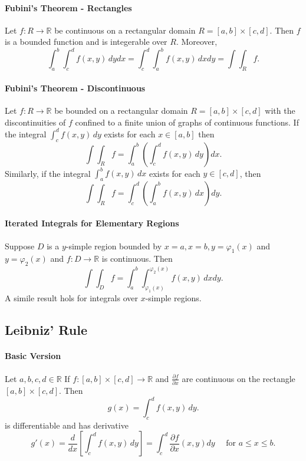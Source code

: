 \paragraph{Fubini's Theorem - Rectangles}
Let \(f: R \to \mathbb R\) be continuous on a rectangular domain \(R = [a, b] \times [c,d].\) Then \(f\) is a bounded function and is integerable over \(R\). Moreover,
\[\int_a^b\int_c^d f(x,y) \, dydx = \int_c^d\int_a^b f(x,y) \, dxdy = \int\int_R f.\]

\paragraph{Fubini's Theorem - Discontinuous}
Let \(f: R \to \mathbb R\) be bounded on a rectangular domain \(R= [a,b] \times [c,d]\) with the discontinuities of \(f\) confined to a finite union of graphs of continuous functions. If the integral \(\int_c^d f(x,y) \, dy\) exists for each \(x\in[a,b]\) then
\[\int\int_R f = \int_a^b \left(\int_c^d f(x,y) \, dy\right) dx.\]
Similarly, if the integral \(\int_a^b f(x,y) \, dx\) exists for each \(y\in[c,d]\), then
\[\int\int_R f = \int_c^d \left(\int_a^b f(x,y) \, dx\right) dy.\]

\paragraph{Iterated Integrals for Elementary Regions}
Suppose \(D\) is a \(y\)-simple region bounded by \(x=a, x=b, y= \varphi_1(x)\) and \(y=\varphi_2(x)\) and \(f:D\to \mathbb R\) is continuous. Then
\[\int\int_D f = \int_a^b \int_{\varphi_1(x)}^{\varphi_2(x)} f(x,y) \, dx dy.\]
A simile result hols for integrals over \(x\)-simple regions.

\subsection{Leibniz' Rule}
\paragraph{Basic Version}
Let \(a,b,c,d \in \mathbb R\) If \(f: [a,b] \times [c,d] \to \mathbb R\) and \(\frac{\partial f}{\partial x}\) are continuous on the rectangle \([a,b] \times [c,d]\). Then
\[g(x) = \int_c^d f(x,y) \, dy.\]
is differentiable and has derivative 
\[g'(x) = \frac{d}{dx}\left[\int_c^d f(x,y) \, dy\right] = \int_c^d \frac{\partial f}{\partial x}(x,y) dy \quad \text{ for } a\leq x\leq b.\]

